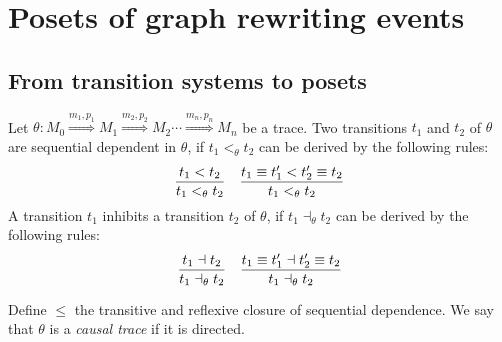 \section{Posets of graph rewriting events}

\subsection{From transition systems to posets}

\begin{definition}
  \label{def:causal_trace}
  Let $\theta:M_0\overset{m_1,p_1}{\Rightarrow} M_1\overset{m_2,p_2}{\Rightarrow} M_2 \cdots \overset{m_n,p_n}{\Rightarrow} M_n$ be a trace.
  Two transitions $t_1$ and $t_2$ of $\theta$ are sequential dependent in $\theta$, if $t_1<_{\theta} t_2$ can be derived by the following rules:
  \begin{align*}
    \frac{t_1 < t_2}{t_1 <_{\theta} t_2}\quad
    \frac{t_1\equiv t_1'<t_2'\equiv t_2}{t_1 <_{\theta} t_2}
  \end{align*}
  A transition $t_1$ inhibits a transition $t_2$ of $\theta$, if $t_1\dashv_{\theta} t_2$ can be derived by the following rules:
  \begin{align*}
    \frac{t_1 \dashv t_2}{t_1 \dashv_{\theta} t_2}\quad
    \frac{t_1\equiv t_1'\dashv t_2'\equiv t_2}{t_1 \dashv_{\theta} t_2}
  \end{align*}

  Define $\leq$ the transitive and reflexive closure of sequential dependence. We say that $\theta$ is a \emph{causal trace} if it is directed.
\end{definition}


